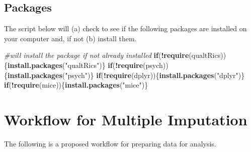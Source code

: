 \documentclass[
  11pt,
]{book}
\newenvironment{Shaded}{\begin{snugshade}}{\end{snugshade}}
\newcommand{\CommentTok}[1]{\textcolor[rgb]{0.37,0.37,0.37}{\textit{#1}}}
\newcommand{\ControlFlowTok}[1]{\textcolor[rgb]{0.27,0.27,0.27}{\textbf{#1}}}
\newcommand{\FunctionTok}[1]{\textcolor[rgb]{0.27,0.27,0.27}{\textbf{#1}}}
\newcommand{\NormalTok}[1]{#1}
\newcommand{\SpecialCharTok}[1]{\textcolor[rgb]{0.43,0.43,0.43}{\textbf{#1}}}
\newcommand{\StringTok}[1]{\textcolor[rgb]{0.5,0.5,0.5}{#1}}
\begin{document}
\hypertarget{packages-3}{%
\subsection{Packages}\label{packages-3}}

The script below will (a) check to see if the following packages are installed on your computer and, if not (b) install them.

\begin{Shaded}
\begin{Highlighting}[]
\CommentTok{\#will install the package if not already installed}
\ControlFlowTok{if}\NormalTok{(}\SpecialCharTok{!}\FunctionTok{require}\NormalTok{(qualtRics))\{}\FunctionTok{install.packages}\NormalTok{(}\StringTok{"qualtRics"}\NormalTok{)\}}
\ControlFlowTok{if}\NormalTok{(}\SpecialCharTok{!}\FunctionTok{require}\NormalTok{(psych))\{}\FunctionTok{install.packages}\NormalTok{(}\StringTok{"psych"}\NormalTok{)\}}
\ControlFlowTok{if}\NormalTok{(}\SpecialCharTok{!}\FunctionTok{require}\NormalTok{(dplyr))\{}\FunctionTok{install.packages}\NormalTok{(}\StringTok{"dplyr"}\NormalTok{)\}}
\ControlFlowTok{if}\NormalTok{(}\SpecialCharTok{!}\FunctionTok{require}\NormalTok{(mice))\{}\FunctionTok{install.packages}\NormalTok{(}\StringTok{"mice"}\NormalTok{)\}}
\end{Highlighting}
\end{Shaded}

\hypertarget{workflow-for-multiple-imputation}{%
\section{Workflow for Multiple Imputation}\label{workflow-for-multiple-imputation}}

The following is a proposed workflow for preparing data for analysis.
\end{document}
